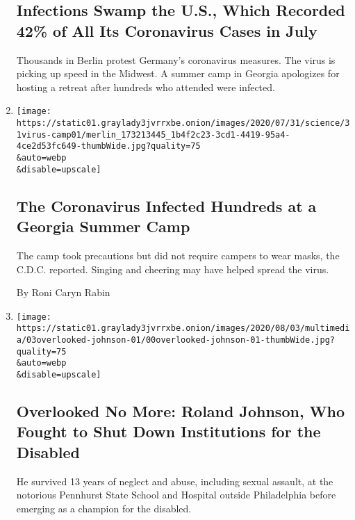 \begin{enumerate}
{  \subsection{Infections Swamp the U.S., Which Recorded 42\% of All Its
  Coronavirus Cases in
  July}\label{infections-swamp-the-us-which-recorded-42-of-all-its-coronavirus-cases-in-july}}

  Thousands in Berlin protest Germany's coronavirus measures. The virus
  is picking up speed in the Midwest. A summer camp in Georgia
  apologizes for hosting a retreat after hundreds who attended were
  infected.
\item
  \href{/2020/07/31/health/coronavirus-children-camp.html}{}

  \texttt{[image: https://static01.graylady3jvrrxbe.onion/images/2020/07/31/science/31virus-camp01/merlin\_173213445\_1b4f2c23-3cd1-4419-95a4-4ce2d53fc649-thumbWide.jpg?quality=75\\\&auto=webp\\\&disable=upscale]}

  \hypertarget{the-coronavirus-infected-hundreds-at-a-georgia-summer-camp}{%
  \subsection{The Coronavirus Infected Hundreds at a Georgia Summer
  Camp}\label{the-coronavirus-infected-hundreds-at-a-georgia-summer-camp}}

  The camp took precautions but did not require campers to wear masks,
  the C.D.C. reported. Singing and cheering may have helped spread the
  virus.

  By Roni Caryn Rabin
\item
  \href{/2020/07/31/obituaries/roland-johnson-overlooked.html}{}

  \texttt{[image: https://static01.graylady3jvrrxbe.onion/images/2020/08/03/multimedia/03overlooked-johnson-01/00overlooked-johnson-01-thumbWide.jpg?quality=75\\\&auto=webp\\\&disable=upscale]}

  \hypertarget{overlooked-no-more-roland-johnson-who-fought-to-shut-down-institutions-for-the-disabled}{%
  \subsection{Overlooked No More: Roland Johnson, Who Fought to Shut
  Down Institutions for the
  Disabled}\label{overlooked-no-more-roland-johnson-who-fought-to-shut-down-institutions-for-the-disabled}}

  He survived 13 years of neglect and abuse, including sexual assault,
  at the notorious Pennhurst State School and Hospital outside
  Philadelphia before emerging as a champion for the disabled.


\end{enumerate}
